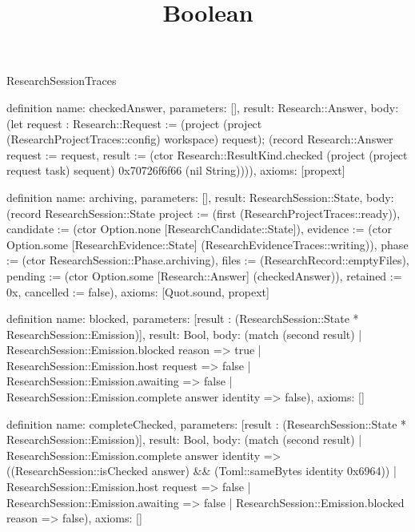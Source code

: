 \begin{lexlean}{ResearchSessionTraces}
\title{Boolean}
\begin{semanticmodule}

definition{
 name: checkedAnswer,
 parameters: [],
 result: Research::Answer,
 body: (let request : Research::Request := (project (project (ResearchProjectTraces::config) workspace) request); (record Research::Answer {request := request, result := (ctor Research::ResultKind.checked (project (project request task) sequent) 0x70726f6f66 (nil String))})),
 axioms: [propext]
}

definition{
 name: archiving,
 parameters: [],
 result: ResearchSession::State,
 body: (record ResearchSession::State {project := (first (ResearchProjectTraces::ready)), candidate := (ctor Option.none [ResearchCandidate::State]), evidence := (ctor Option.some [ResearchEvidence::State] (ResearchEvidenceTraces::writing)), phase := (ctor ResearchSession::Phase.archiving), files := (ResearchRecord::emptyFiles), pending := (ctor Option.some [Research::Answer] (checkedAnswer)), retained := 0x, cancelled := false}),
 axioms: [Quot.sound, propext]
}

definition{
 name: blocked,
 parameters: [result : (ResearchSession::State * ResearchSession::Emission)],
 result: Bool,
 body: (match (second result) | ResearchSession::Emission.blocked reason => true | ResearchSession::Emission.host request => false | ResearchSession::Emission.awaiting => false | ResearchSession::Emission.complete answer identity => false),
 axioms: []
}

definition{
 name: completeChecked,
 parameters: [result : (ResearchSession::State * ResearchSession::Emission)],
 result: Bool,
 body: (match (second result) | ResearchSession::Emission.complete answer identity => ((ResearchSession::isChecked answer) && (Toml::sameBytes identity 0x6964)) | ResearchSession::Emission.host request => false | ResearchSession::Emission.awaiting => false | ResearchSession::Emission.blocked reason => false),
 axioms: []
}


\end{semanticmodule}
\end{lexlean}

